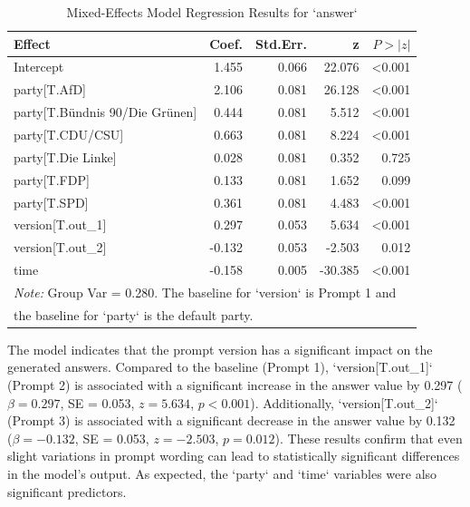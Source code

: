 \documentclass[12pt]{article}
\begin{document}
\begin{table}[h!]
\centering
\caption{Mixed-Effects Model Regression Results for `answer`}
\label{tab:mixed_model_results}
\begin{tabular}{lrrrr}
\hline
\textbf{Effect} & \textbf{Coef.} & \textbf{Std.Err.} & \textbf{z} & \textbf{$P>|z|$} \\
\hline
Intercept                       & 1.455    & 0.066  & 22.076 & \textless 0.001 \\
party[T.AfD]                    & 2.106    & 0.081  & 26.128 & \textless 0.001 \\
party[T.Bündnis 90/Die Grünen]  & 0.444    & 0.081  & 5.512  & \textless 0.001 \\
party[T.CDU/CSU]                & 0.663    & 0.081  & 8.224  & \textless 0.001 \\
party[T.Die Linke]              & 0.028    & 0.081  & 0.352  & 0.725 \\
party[T.FDP]                    & 0.133    & 0.081  & 1.652  & 0.099 \\
party[T.SPD]                    & 0.361    & 0.081  & 4.483  & \textless 0.001 \\
version[T.out\_1]                & 0.297    & 0.053  & 5.634  & \textless 0.001 \\
version[T.out\_2]               & -0.132   & 0.053  & -2.503 & 0.012 \\
time                            & -0.158   & 0.005  & -30.385& \textless 0.001 \\
\hline
\multicolumn{5}{l}{\textit{Note:} Group Var = 0.280. The baseline for `version` is Prompt 1 and} \\
\multicolumn{5}{l}{the baseline for `party` is the default party.}
\end{tabular}
\end{table}

The model indicates that the prompt version has a significant impact on the generated answers. Compared to the baseline (Prompt 1), `version[T.out\_1]` (Prompt 2) is associated with a significant increase in the answer value by 0.297 ($\beta = 0.297$, SE = 0.053, $z = 5.634$, $p < 0.001$). Additionally, `version[T.out\_2]` (Prompt 3) is associated with a significant decrease in the answer value by 0.132 ($\beta = -0.132$, SE = 0.053, $z = -2.503$, $p = 0.012$). These results confirm that even slight variations in prompt wording can lead to statistically significant differences in the model's output. As expected, the `party` and `time` variables were also significant predictors.
\end{document}
